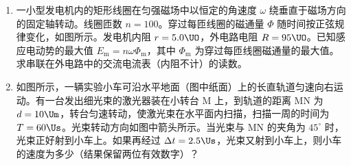 \documentclass[\gkver]{gaokaozhenti}
\begin{document}
\begin{enumerate}
{气室 1：$p_{0}V_{1}=p(V_{1}-Sd+Sx)$ ①

气室 2：$p_{0}V_{2}=p(V_{2}-Sx)$ ②

由①、②两式解得 $x=\frac{V_{2}}{V_{1}+V_{2}}d$ ③

由题意 $\frac{V_{1}}{V_{2}}=\frac{3}{2}$，得 $x=\frac{2}{5}d$ ④

评分标准：本题 11 分，①式 4 分，②式 3 分，得出③式 2 分，算出④式再给 2 分。
}

\item
一小型发电机内的矩形线圈在匀强磁场中以恒定的角速度 $\omega$ 绕垂直于磁场方向的固定轴转动。线圈匝数 $n=100$。穿过每匝线圈的磁通量 $\Phi$ 随时间按正弦规律变化，如图所示。发电机内阻 $r=5.0\UO$，外电路电阻 $R=95\UO$。已知感应电动势的最大值 $E_{\mathrm{m}}=n\omega\Phi_{\mathrm{m}}$，其中 $\Phi_{\mathrm{m}}$ 为穿过每匝线圈磁通量的最大值。求串联在外电路中的交流电流表（内阻不计）的读数。



\item
如图所示，一辆实验小车可沿水平地面（图中纸面）上的长直轨道匀速向右运动。有一台发出细光束的激光器装在小转台 M 上，到轨道的距离 MN 为 $d=10\Um$，转台匀速转动，使激光束在水平面内扫描，扫描一周的时间为 $T=60\Us$。光束转动方向如图中箭头所示。当光束与 MN 的夹角为 $45^\circ$ 时，光束正好射到小车上。如果再经过 $\Delta t=2.5\Us$，光束又射到小车上，则小车的速度为多少（结果保留两位有效数字）？


\end{enumerate}
\end{document}
